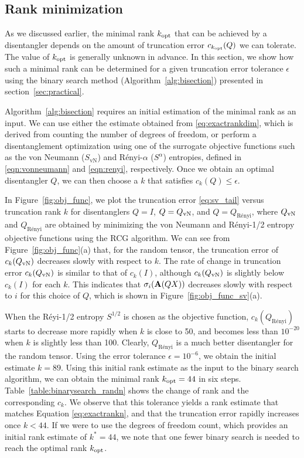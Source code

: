 \documentclass[pdflatex,sn-mathphys-num]{sn-jnl}
\newcounter{thm}[section]
\begin{document}
\subsection{Rank minimization} 
As we discussed earlier, the minimal rank $k_{\rm opt}$ that can be achieved by a disentangler depends on the amount of truncation error $c_{k_{\rm opt}}(Q)$ we can tolerate. The value of $k_{\rm opt}$ is generally unknown in advance.  In this section, we show how such a minimal rank can be determined for a given truncation error tolerance $\epsilon$ using the binary search method (Algorithm~\ref{alg:bisection}) presented in section~\ref{sec:practical}.

Algorithm~\ref{alg:bisection} requires an initial estimation of the minimal rank as an input. We can use either the estimate obtained from \eqref{eq:exactrankdim}, which is derived from counting the number of degrees of freedom, or perform a disentanglement optimization using one of the surrogate objective functions such as the von Neumann ($S_\textrm{vN}$) and Rényi-$\alpha$ ($S^\alpha$) entropies, defined in \eqref{eqn:vonneumann} and \eqref{eqn:renyi}, respectively. Once we obtain an optimal disentangler $Q$, we can then choose a $k$ that satisfies $c_k(Q) \leq \epsilon$.

In Figure~\ref{fig:obj_func}, we plot the truncation error \eqref{eq:sv_tail} versus truncation rank $k$ for disentanglers $Q=I$, $Q=Q_{\rm vN}$, and $Q=Q_{\mbox{R\'{e}nyi}}$, where $Q_{\rm vN}$ and $Q_{\mbox{R\'{e}nyi}}$ are obtained by minimizing the von Neumann and Rényi-1/2 entropy objective functions using the RCG algorithm. 
We can see from Figure~\ref{fig:obj_func}(a) that, for the random tensor, the truncation error of $c_k(Q_{\rm vN})$ decreases slowly with respect to $k$. The rate of change in truncation error $c_k(Q_{\rm vN})$ is similar to that of $c_k(I)$, although $c_k(Q_{\rm vN})$ is slightly below $c_k(I)$ for each $k$. This indicates that $\sigma_i({\bf A}(QX))$ decreases slowly with respect to $i$ for this choice of $Q$, which is shown in Figure~\ref{fig:obj_func_sv}(a).

When the R\'{e}yi-1/2 entropy $S^{1/2}$ is chosen as the objective function, $c_k(Q_{\mbox{R\'{e}nyi}})$ starts to decrease more rapidly when $k$ is close to 50, and becomes less than $10^{-20}$ when $k$ is slightly less than 100. 
Clearly, $Q_{\mbox{R\'{e}nyi}}$ is a much better disentangler for the random tensor.  Using the error tolerance $\epsilon = 10^{-6}$, we obtain the initial estimate $k=89$. Using this initial rank estimate as the input to the binary search algorithm, we can obtain the minimal rank $k_{\rm opt}=44$ in six steps. Table~\ref{table:binarysearch_randn} shows the change of rank and the corresponding $c_k$. We observe that this tolerance yields a rank estimate that matches Equation \eqref{eq:exactrankn}, and that the truncation error rapidly increases once $k < 44$. 
If we were to use the degrees of freedom count, which provides an initial rank estimate of $k^*=44$, we note that one fewer binary search is needed to reach the optimal rank $k_{\rm opt}$.
\end{document}
